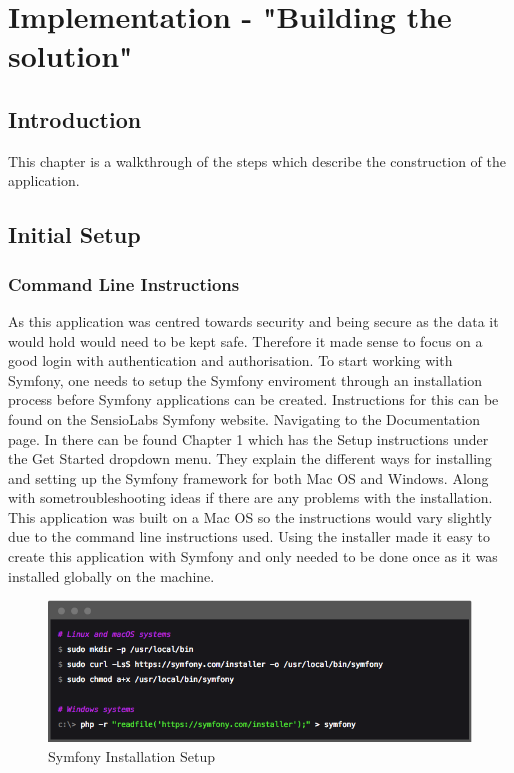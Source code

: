 \chapter{Implementation - "Building the solution"}


\section{Introduction}

This chapter is a walkthrough of the steps which describe the construction of the application.

\section{Initial Setup}

\subsection{Command Line Instructions}

As this application was centred towards security and being secure as the data it would hold would need to be kept safe. Therefore it made sense to focus on a good login with authentication and authorisation. To start working with Symfony, one needs to setup the Symfony enviroment through an installation process before Symfony applications can be created. Instructions for this can be found on the SensioLabs Symfony website. Navigating to the Documentation page. In there can be found Chapter 1 which has the Setup instructions under the Get Started dropdown menu. They explain the different ways for installing and setting up the Symfony framework for both Mac OS and Windows. Along with some\newline troubleshooting ideas if there are any problems with the installation. This application was built on a Mac OS so the instructions would vary slightly due to the command line instructions used. Using the installer made it easy to create this application with Symfony and only needed to be done once as it was installed globally on the machine.

\begin{figure}[htbp]
   \centering
   \includegraphics[width=400pt]{figures/symfony_installation.png} %
   \caption{Symfony Installation Setup}
   \label{fig:Symfony Installation Setup}
\end{figure}

